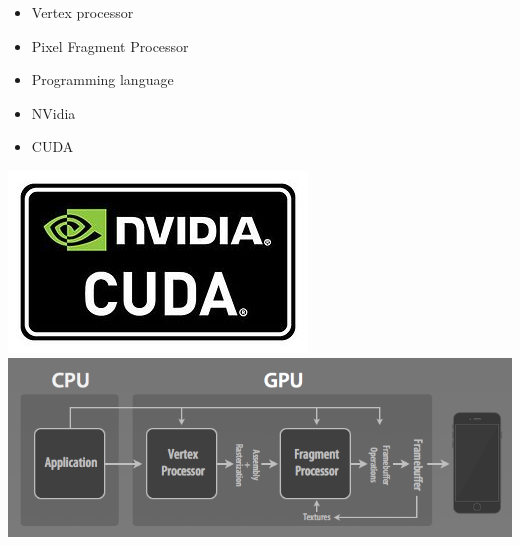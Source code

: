 \documentclass{beamer}
\begin{document}
\begin{frame}
\begin{itemize}
	\item {Vertex processor}
	\item {Pixel Fragment Processor}
\end{itemize}
\begin{itemize}
	\item Programming language
	\item NVidia 
	\item CUDA
\end{itemize}
\includegraphics[scale=0.3]{cuda}
\includegraphics[scale=0.3]{vertex}
\end{frame}
\end{document}
